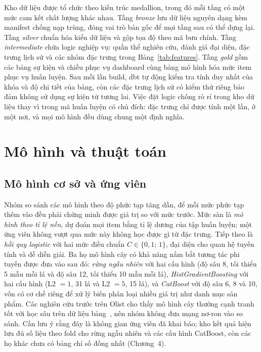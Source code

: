 Kho dữ liệu được tổ chức theo kiến trúc medallion, trong đó mỗi tầng có một mức cam kết chất lượng khác nhau. Tầng \emph{bronze} lưu dữ liệu nguyên dạng kèm manifest chống nạp trùng, đóng vai trò bản gốc để mọi tầng sau có thể dựng lại. Tầng \emph{silver} chuẩn hóa kiểu dữ liệu và gộp tọa độ theo mã bưu chính. Tầng \emph{intermediate} chứa logic nghiệp vụ: quần thể nghiên cứu, đánh giá đại diện, đặc trưng lịch sử và các nhóm đặc trưng trong Bảng~\ref{tab:features}. Tầng \emph{gold} gồm các bảng sự kiện và chiều phục vụ dashboard cùng bảng mô hình hóa mức item phục vụ huấn luyện. Sau mỗi lần build, dbt tự động kiểm tra tính duy nhất của khóa và độ chi tiết của bảng, còn các đặc trưng lịch sử có kiểm thử riêng bảo đảm không sử dụng sự kiện từ tương lai. Việc đặt logic chống rò rỉ trong kho dữ liệu thay vì trong mã huấn luyện có chủ đích: đặc trưng chỉ được tính một lần, ở một nơi, và mọi mô hình đều dùng chung một định nghĩa.

\section{Mô hình và thuật toán}\label{sec:models}

\subsection{Mô hình cơ sở và ứng viên}

Nhóm so sánh các mô hình theo độ phức tạp tăng dần, để mỗi mức phức tạp thêm vào đều phải chứng minh được giá trị so với mức trước. Mức sàn là \emph{mô hình theo tỉ lệ nền}, dự đoán mọi item bằng tỉ lệ dương của tập huấn luyện; một ứng viên không vượt qua mức này không học được gì từ đặc trưng. Tiếp theo là \emph{hồi quy logistic} với hai mức điều chuẩn $C \in \{0{,}1;\,1\}$, đại diện cho quan hệ tuyến tính và dễ diễn giải. Ba họ mô hình cây có khả năng nắm bắt tương tác phi tuyến được đưa vào sau đó: \emph{rừng ngẫu nhiên} với hai cấu hình (độ sâu 8, tối thiểu 5 mẫu mỗi lá và độ sâu 12, tối thiểu 10 mẫu mỗi lá), \emph{HistGradientBoosting} với hai cấu hình (L2 $=1$, 31 lá và L2 $=5$, 15 lá), và \emph{CatBoost} với độ sâu 6, 8 và 10, vốn có cơ chế riêng để xử lý biến phân loại nhiều giá trị như danh mục sản phẩm. Các nghiên cứu trước trên Olist cho thấy mô hình cây thường cạnh tranh tốt với học sâu trên dữ liệu bảng~\cite{zaghloul2024}, nên nhóm không đưa mạng nơ-ron vào so sánh. Cần lưu ý rằng đây là không gian ứng viên đã khai báo; kho kết quả hiện lưu đủ số liệu theo fold cho rừng ngẫu nhiên và các cấu hình CatBoost, còn các họ khác chưa có bảng chỉ số đồng nhất (Chương~4).

